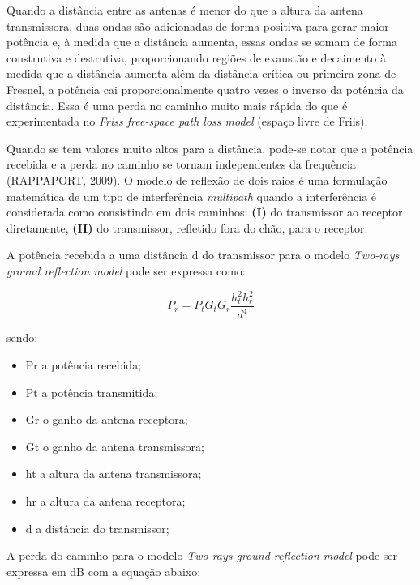 \documentclass[
	12pt,				%
	openright,			%
	twoside,			%
	a4paper,			%
	english,			%
	french,				%
	spanish,			%
	brazil				%
	]{abntex2}
\begin{document}
Quando a distância entre as antenas é menor do que a altura da antena transmissora, duas ondas são adicionadas de forma positiva para gerar maior potência e, à medida que a distância aumenta, essas ondas se somam de forma construtiva e destrutiva, proporcionando regiões de exaustão e decaimento à medida que a distância aumenta além da distância crítica ou primeira zona de Fresnel, a potência cai proporcionalmente quatro vezes o inverso da potência da distância. Essa é uma perda no caminho muito mais rápida do que é experimentada no \textit{Friss free-space path loss model} (espaço livre de Friis).

Quando se tem valores muito altos para a distância, pode-se notar que a potência recebida e a perda no caminho se tornam independentes da frequência (RAPPAPORT, 2009). O modelo de reflexão de dois raios é uma formulação matemática de um tipo de interferência \textit{multipath} quando a interferência é considerada como consistindo em dois caminhos: \textbf{(I)} do transmissor ao receptor diretamente, \textbf{(II)} do transmissor, refletido fora do chão, para o receptor.

A potência recebida a uma distância d do transmissor para o modelo \textit{Two-rays ground reflection model} pode ser expressa como:


\begin{equation}
P_{r} = P_{t}G_{t}G_{r}\frac{h^{2}_{t}h^{2}_{r}}{d^{4}}
\end{equation}

sendo:

\begin{itemize}
	\item Pr a potência recebida;
	\item Pt a potência transmitida;
	\item Gr o ganho da antena receptora;
	\item Gt o ganho da antena transmissora;
	\item ht a altura da antena transmissora;
	\item hr a altura da antena receptora;
	\item d a distância do transmissor;
\end{itemize}

A perda do caminho para o modelo \textit{Two-rays ground reflection model} pode ser expressa em dB com a equação abaixo:

\end{document}

